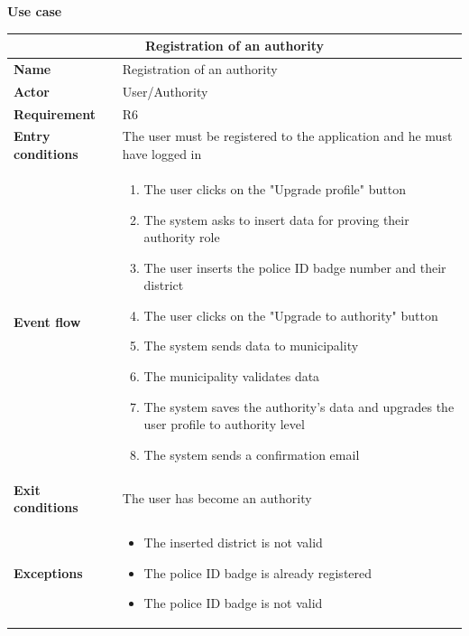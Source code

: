 \begin{description}
    \item \textbf{Use case}
    \begin{center}
        \begin{tabular}{|p{3cm}|p{7cm}|}
            \multicolumn{2}{c}{\textbf{Registration of an authority}} \\
            \hline
            \textbf{Name} & Registration of an authority \\
            \hline
            \textbf{Actor} & User/Authority \\
            \hline
            \textbf{Requirement} & R6 \\
            \hline
            \textbf{Entry conditions} & The user must be registered to the application and he must have logged in \\
            \hline
            \textbf{Event flow} &
            \begin{enumerate}
                \item The user clicks on the "Upgrade profile" button
                \item The system asks to insert data for proving their authority role 
                \item The user inserts the police ID badge number and their district 
                \item The user clicks on the "Upgrade to authority" button
                \item The system sends data to municipality
                \item The municipality validates data 
                \item The system saves the authority's data and upgrades the user profile to authority level 
                \item The system sends a confirmation email
            \end{enumerate} \\
            \hline
            \textbf{Exit conditions} & The user has become an authority \\
            \hline
            \textbf{Exceptions}
            & \begin{itemize}
                \item The inserted district is not valid
                \item The police ID badge is already registered             
                \item The police ID badge is not valid
            \end{itemize} \\
            \hline
        \end{tabular}
    \end{center}
\end{description}

